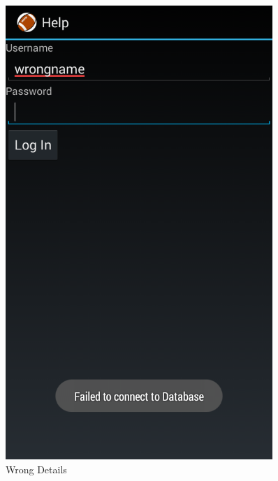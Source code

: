 \documentclass[hidelinks,a4paper,12pt]{article}
\begin{document}
\begin{figure}[!htb]
\begin{minipage}[b]{0.4\textwidth}
    			\includegraphics[width=0.9\textwidth]{./images/wrong_login.png}
    			\caption{Wrong Details}
  			\end{minipage}
		\end{figure}
		
\end{document}
